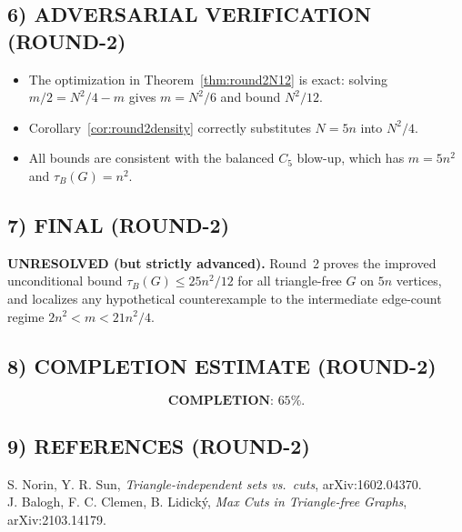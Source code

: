 \subsection*{6) ADVERSARIAL VERIFICATION (ROUND-2)}
\begin{itemize}
\item The optimization in Theorem~\ref{thm:round2N12} is exact: solving
      $m/2=N^2/4-m$ gives $m=N^2/6$ and bound $N^2/12$.
\item Corollary~\ref{cor:round2density} correctly substitutes $N=5n$ into $N^2/4$.
\item All bounds are consistent with the balanced $C_5$ blow-up, which has
      $m=5n^2$ and $\tau_B(G)=n^2$.
\end{itemize}

\subsection*{7) FINAL (ROUND-2)}
\textbf{UNRESOLVED (but strictly advanced).}
Round~2 proves the improved unconditional bound $\tau_B(G)\le 25n^2/12$
for all triangle-free $G$ on $5n$ vertices, and localizes any hypothetical
counterexample to the intermediate edge-count regime $2n^2<m<21n^2/4$.

\subsection*{8) COMPLETION ESTIMATE (ROUND-2)}
\[
\textbf{COMPLETION: }65\%.
\]

\subsection*{9) REFERENCES (ROUND-2)}
S. Norin, Y. R. Sun, \emph{Triangle-independent sets vs.\ cuts}, arXiv:1602.04370.\\
J. Balogh, F. C. Clemen, B. Lidick\'y, \emph{Max Cuts in Triangle-free Graphs}, arXiv:2103.14179.


